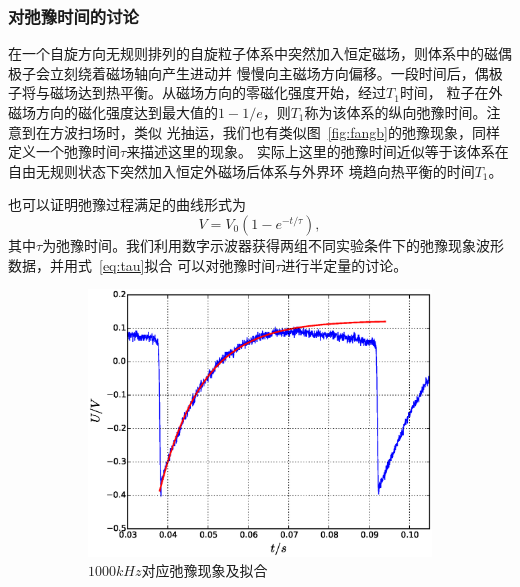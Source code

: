 \documentclass[11pt,a4paper]{article}
\begin{document}
\begin{spacing}{1.3}
\begin{CJK*}{UTF8}{gbsn}
\subsubsection{对弛豫时间的讨论}
在一个自旋方向无规则排列的自旋粒子体系中突然加入恒定磁场，则体系中的磁偶极子会立刻绕着磁场轴向产生进动并
慢慢向主磁场方向偏移。一段时间后，偶极子将与磁场达到热平衡。从磁场方向的零磁化强度开始，经过$T_1$时间，
粒子在外磁场方向的磁化强度达到最大值的$1-1/e$，则$T_1$称为该体系的纵向弛豫时间。注意到在方波扫场时，类似
光抽运，我们也有类似图~\ref{fig:fangb}的弛豫现象，同样定义一个弛豫时间$\tau$来描述这里的现象。
实际上这里的弛豫时间近似等于该体系在自由无规则状态下突然加入恒定外磁场后体系与外界环
境趋向热平衡的时间$T_1$。\par 
也可以证明弛豫过程满足的曲线形式为
\begin{equation}
V=V_0(1-e^{-t/\tau}),\label{eq:tau}
\end{equation}
其中$\tau$为弛豫时间\cite{lcr}。我们利用数字示波器获得两组不同实验条件下的弛豫现象波形数据，并用式~\eqref{eq:tau}拟合
可以对弛豫时间$\tau$进行半定量的讨论。\par 
\begin{figure}[h!]
\begin{subfigure}{0.50\textwidth}
\includegraphics[width=\linewidth]{1112b} 
\caption{$1000kHz$对应弛豫现象及拟合}
\label{fig:1000}
\end{subfigure}
\begin{subfigure}{0.50\textwidth}
\centering

\end{subfigure}
\end{figure}
\end{CJK*}
\end{spacing}
\end{document}
